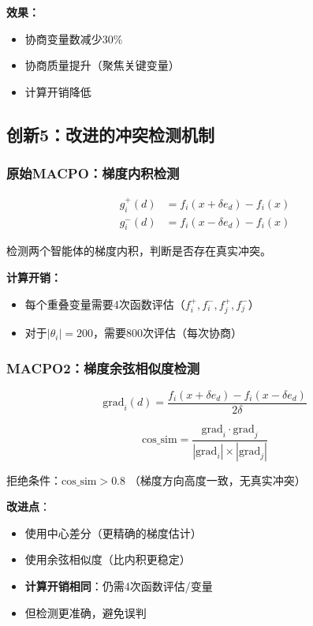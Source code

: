 \documentclass[15pt,a3paper]{ctexart}
\begin{document}
\textbf{效果：}
\begin{itemize}
    \item 协商变量数减少30\%
    \item 协商质量提升（聚焦关键变量）
    \item 计算开销降低
\end{itemize}

\subsection{创新5：改进的冲突检测机制}

\subsubsection{原始MACPO：梯度内积检测}

\begin{align}
g_i^{+}(d) &= f_i(x + \delta e_d) - f_i(x) \\
g_i^{-}(d) &= f_i(x - \delta e_d) - f_i(x)
\end{align}

检测两个智能体的梯度内积，判断是否存在真实冲突。

\textbf{计算开销：}
\begin{itemize}
    \item 每个重叠变量需要4次函数评估（$f_i^+, f_i^-, f_j^+, f_j^-$）
    \item 对于$|\theta_i| = 200$，需要800次评估（每次协商）
\end{itemize}

\subsubsection{MACPO2：梯度余弦相似度检测}

\begin{equation}
\text{grad}_i(d) = \frac{f_i(x + \delta e_d) - f_i(x - \delta e_d)}{2\delta}
\end{equation}

\begin{equation}
\text{cos\_sim} = \frac{\text{grad}_i \cdot \text{grad}_j}{|\text{grad}_i| \times |\text{grad}_j|}
\end{equation}

拒绝条件：$\text{cos\_sim} > 0.8$ （梯度方向高度一致，无真实冲突）

\textbf{改进点}：
\begin{itemize}
    \item 使用中心差分（更精确的梯度估计）
    \item 使用余弦相似度（比内积更稳定）
    \item \textbf{计算开销相同}：仍需4次函数评估/变量
    \item 但检测更准确，避免误判
\end{itemize}
\end{document}

